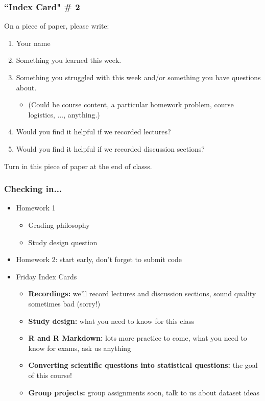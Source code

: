 \documentclass[12pt, 
hyperref={colorlinks=true, linkcolor=blue, urlcolor=cyan}]{beamer}
\begin{document}
\begin{frame}
\frametitle{``Index Card" \# 2}
On a piece of paper, please write:
\begin{enumerate}
\item Your name
\item Something you learned this week.
\item Something you struggled with this week and/or something you have questions about. 
	\begin{itemize}
	\item[] \begin{footnotesize} (Could be course content, a particular homework problem, course logistics, ..., anything.) \end{footnotesize}
	\end{itemize}
\item Would you find it helpful if we recorded lectures?
\item Would you find it helpful if we recorded discussion sections?
\end{enumerate}
Turn in this piece of paper at the end of classs.
\end{frame}

\begin{frame}
\frametitle{Checking in...}

\begin{itemize}
\item Homework 1 %
	\begin{itemize}
	\item Grading philosophy
	\item Study design question
	\end{itemize}
\item Homework 2: start early, don't forget to submit code %
\item Friday Index Cards
	\begin{itemize}
	\item \textbf{Recordings:} we'll record lectures and discussion sections, sound quality sometimes bad (sorry!) 
	\item \textbf{Study design:} what you need to know for this class
	\item \textbf{R and R Markdown:} lots more practice to come, what you need to know for exams, ask us anything
	\item \textbf{Converting scientific questions into statistical questions:} the goal of this course!
	\item \textbf{Group projects:} group assignments soon, talk to us about dataset ideas
	\end{itemize}
\end{itemize}

\end{frame}
\end{document}
